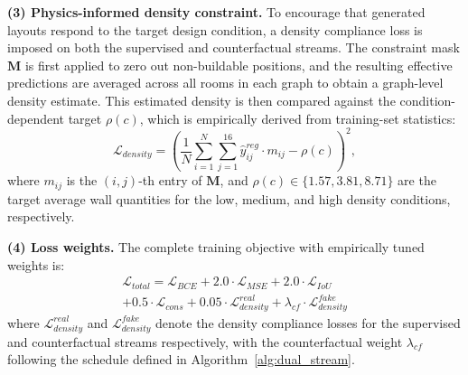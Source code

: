 \textbf{(3) Physics-informed density constraint.} To encourage that generated layouts respond to the target design condition, a density compliance loss is imposed on both the supervised and counterfactual streams.
The constraint mask $\mathbf{M}$ is first applied to zero out non-buildable positions, and the resulting effective predictions are averaged across all rooms in each graph to obtain a graph-level density estimate.
This estimated density is then compared against the condition-dependent target $\rho(c)$, which is empirically derived from training-set statistics:
\begin{equation}
\mathcal{L}_{density} = \left(\frac{1}{N}\sum_{i=1}^{N}\sum_{j=1}^{16} \hat{y}_{ij}^{reg} \cdot m_{ij} - \rho(c)\right)^2,
\label{eq:loss_density}
\end{equation}
where $m_{ij}$ is the $(i,j)$-th entry of $\mathbf{M}$, and $\rho(c) \in \{1.57, 3.81, 8.71\}$ are the target average wall quantities for the low, medium, and high density conditions, respectively.

\textbf{(4) Loss weights.} The complete training objective with empirically tuned weights is:
\begin{multline}
\mathcal{L}_{total} = \mathcal{L}_{BCE} + 2.0 \cdot \mathcal{L}_{MSE} + 2.0 \cdot \mathcal{L}_{IoU} \\
+ 0.5 \cdot \mathcal{L}_{cons} + 0.05 \cdot \mathcal{L}_{density}^{real} + \lambda_{cf} \cdot \mathcal{L}_{density}^{fake}
\end{multline}
where $\mathcal{L}_{density}^{real}$ and $\mathcal{L}_{density}^{fake}$ denote the density compliance losses for the supervised and counterfactual streams respectively, with the counterfactual weight $\lambda_{cf}$ following the schedule defined in Algorithm~\ref{alg:dual_stream}.
